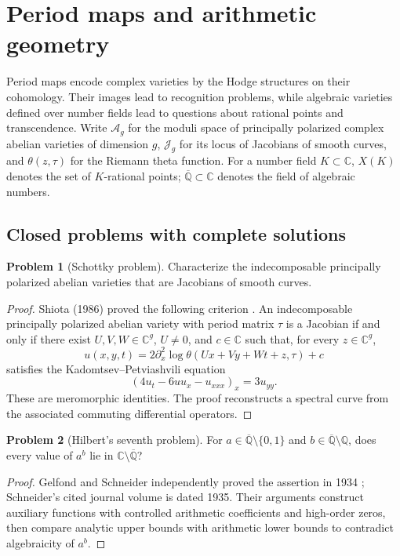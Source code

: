 \documentclass[11pt,reqno]{amsart}
\theoremstyle{definition}
\newtheorem{problem}{Problem}[section]
\theoremstyle{remark}
\begin{document}
\section{Period maps and arithmetic geometry}
Period maps encode complex varieties by the Hodge structures on their cohomology. Their images lead to recognition problems, while algebraic varieties defined over number fields lead to questions about rational points and transcendence. Write $\mathcal A_g$ for the moduli space of principally polarized complex abelian varieties of dimension $g$, $\mathcal J_g$ for its locus of Jacobians of smooth curves, and $\theta(z,\tau)$ for the Riemann theta function. For a number field $K\subset\mathbb C$, $X(K)$ denotes the set of $K$-rational points; $\overline{\mathbb Q}\subset\mathbb C$ denotes the field of algebraic numbers.

\subsection{Closed problems with complete solutions}

\begin{problem}[Schottky problem]\label{Siu-4.1}
Characterize the indecomposable principally polarized abelian varieties that are Jacobians of smooth curves.
\end{problem}
\begin{proof}
Shiota (1986) proved the following criterion \cite{SIU-Shi86}. An indecomposable principally polarized abelian variety with period matrix $\tau$ is a Jacobian if and only if there exist $U,V,W\in\mathbb C^g$, $U\ne0$, and $c\in\mathbb C$ such that, for every $z\in\mathbb C^g$,
\[
u(x,y,t)=2\partial_x^2\log\theta(Ux+Vy+Wt+z,\tau)+c
\]
satisfies the Kadomtsev--Petviashvili equation
\[
(4u_t-6uu_x-u_{xxx})_x=3u_{yy}.
\]
These are meromorphic identities. The proof reconstructs a spectral curve from the associated commuting differential operators.
\end{proof}

\begin{problem}[Hilbert's seventh problem]\label{Siu-4.7}
For $a\in\overline{\mathbb Q}\setminus\{0,1\}$ and $b\in\overline{\mathbb Q}\setminus\mathbb Q$, does every value of $a^b$ lie in $\mathbb C\setminus\overline{\mathbb Q}$?
\end{problem}
\begin{proof}
Gelfond and Schneider independently proved the assertion in 1934 \cite{SIU-Gel34,SIU-Sch34}; Schneider's cited journal volume is dated 1935. Their arguments construct auxiliary functions with controlled arithmetic coefficients and high-order zeros, then compare analytic upper bounds with arithmetic lower bounds to contradict algebraicity of $a^b$.
\end{proof}
\end{document}
